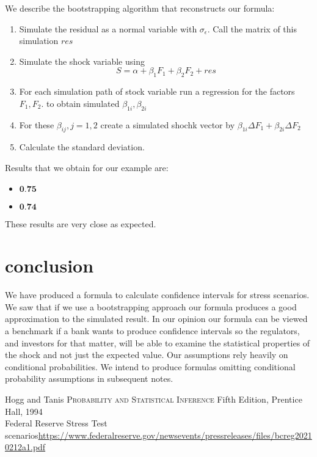 \documentclass[a4paper]{amsart}
\begin{document}
We describe the bootstrapping algorithm that reconstructs our formula: 
\begin{enumerate}
\item Simulate the residual as a normal variable with $\sigma_{\epsilon}.$ Call the matrix of this simulation $res$
\item Simulate the shock variable using $$S=\alpha+\beta_1 F_1+\beta_2F_2+ res$$
\item For each simulation path of stock variable run a regression for the factors $F_1,F_2.$ to obtain simulated $\beta_{1i},\beta_{2i}$ 
\item For these $\beta_{ij},j=1,2$ create a simulated shochk vector by $\beta_{1i}\Delta F_1+\beta_{2i}\Delta F_2$
\item Calculate the standard deviation. 
\end{enumerate}
Results that we obtain for our example are:
\begin{itemize}
\item $\textbf{0.75}$
\item $\textbf{0.74}$ 
\end{itemize}
These results are very close as expected. 

\section{conclusion}
We have produced a formula to calculate confidence intervals for stress scenarios. We saw that if we use a bootstrapping approach our formula produces a good approximation to the simulated result. In our opinion our formula can be viewed a benchmark if a bank wants to produce confidence intervals so the regulators, and investors for that matter, will be able to examine the statistical properties of the shock and not just the expected value. Our assumptions rely heavily on conditional probabilities. We intend to produce formulas omitting  conditional probability assumptions in subsequent notes. 

\begin{thebibliography}{3}
Hogg and Tanis \textsc{Probability and Statistical Inference} Fifth Edition, Prentice Hall, 1994\\
Federal Reserve Stress Test scenarios\url{https://www.federalreserve.gov/newsevents/pressreleases/files/bcreg20210212a1.pdf}
\end{thebibliography}
\end{document}
